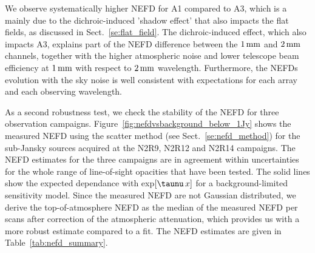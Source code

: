We observe systematically higher NEFD for A1 compared to
A3, which is a mainly due to the dichroic-induced 'shadow effect' that
also impacts the flat fields, as discussed in
Sect.~\ref{se:flat_field}.
The dichroic-induced effect, which also impacts
A3, explains part of the NEFD difference between the $1\, \rm{mm}$ and
$2\, \rm{mm}$ channels, together with the higher atmospheric noise and
lower telescope beam efficiency at $1\, \rm{mm}$ with respect to
$2\,\rm{mm}$ wavelength.   
Furthermore, the NEFDs evolution with the sky noise is well consistent
with expectations for each array and each observing
wavelength. 

As a second robustness test, we check the stability of the NEFD for
three observation campaigns. Figure~\ref{fig:nefdvsbackground_below_1Jy} shows the
measured NEFD using the scatter method (see Sect.~\ref{se:nefd_method}) for the
sub-Jansky sources acquired at the N2R9, N2R12 and N2R14
campaigns. The NEFD estimates for the
three campaigns are in agreement within uncertainties for the whole
range of line-of-sight opacities that have been tested.
The solid lines show the expected dependance with
exp${[\taunu\,x]}$ for a background-limited sensitivity
model. Since the measured NEFD are not Gaussian distributed, we
derive the top-of-atmosphere NEFD as the median of the measured NEFD
per scans after correction of the atmospheric attenuation, which provides us
with a more robust estimate compared to a fit. The NEFD estimates
are given in Table~\ref{tab:nefd_summary}.

